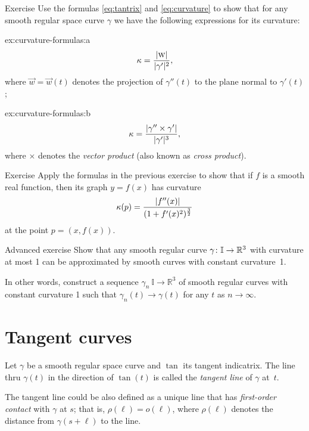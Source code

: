 \begin{thm}{Exercise}\label{ex:curvature-formulas}
Use the formulas \ref{eq:tantrix} and \ref{eq:curvature} to show that 
for any smooth regular space curve $\gamma$ we have the following expressions for its curvature:

\begin{subthm}{ex:curvature-formulas:a} 
\[\kappa=\frac{|\text{\sc{w}}|}{|\gamma'|^2},\]
where $\vec w=\vec w(t)$ denotes the projection of $\gamma''(t)$ to the plane normal to $\gamma'(t)$;
\end{subthm}

\begin{subthm}{ex:curvature-formulas:b}
\[\kappa=\frac{|\gamma''\times \gamma'|}{|\gamma'|^{3}},\]
where $\times$ denotes the \emph{vector product} (also known as \emph{cross product}).
\end{subthm}

\end{thm}


\begin{thm}{Exercise}\label{ex:curvature-graph}
Apply the formulas in the previous exercise to show that if $f$ is a smooth real function,
then its graph $y=f(x)$  has curvature
\[\kappa(p)=\frac{|f''(x)|}{(1+f'(x)^2)^{\frac32}}\]
at the point $p=(x,f(x))$.
\end{thm}

\begin{thm}{Advanced exercise}\label{ex:approximation-const-curvature}
Show that any smooth regular curve $\gamma\:\mathbb{I}\z\to\mathbb{R}^3$ with curvature at most 1 can be approximated by smooth curves with constant curvature~1.

In other words, construct a sequence $\gamma_n\:\mathbb{I}\to\mathbb{R}^3$ of smooth regular curves  with constant curvature 1 such that $\gamma_n(t)\to \gamma(t)$ for any $t$ as $n\to\infty$.
\end{thm}


\section{Tangent curves}

Let $\gamma$ be a smooth regular space curve and $\tan$ its tangent indicatrix.
The line thru $\gamma(t)$ in the direction of $\tan(t)$ is called the \emph{tangent line} of $\gamma$  at~$t$.

The tangent line could be also defined as a unique line that has \emph{first-order contact} with $\gamma$ at $s$;
that is, $\rho(\ell)=o(\ell)$, where $\rho(\ell)$ denotes the distance from $\gamma(s+\ell)$ to the line.


